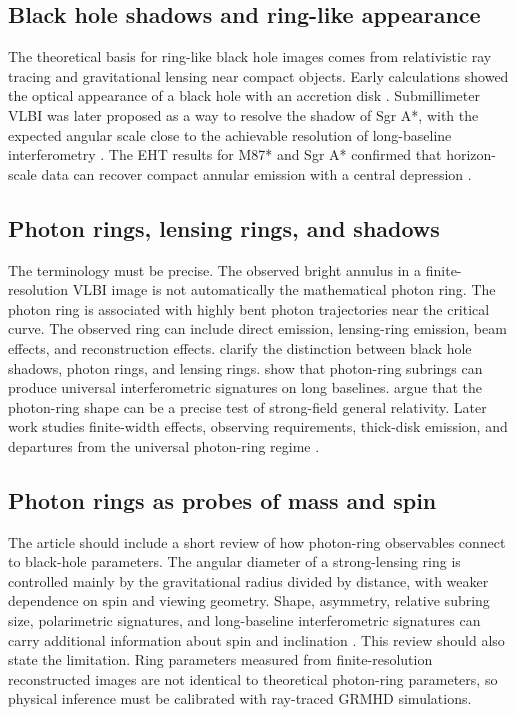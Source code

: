 \documentclass[11pt]{article}
\begin{document}
\subsection{Black hole shadows and ring-like appearance}
The theoretical basis for ring-like black hole images comes from relativistic ray tracing and gravitational lensing near compact objects. Early calculations showed the optical appearance of a black hole with an accretion disk \citep{Luminet1979}. Submillimeter VLBI was later proposed as a way to resolve the shadow of Sgr A*, with the expected angular scale close to the achievable resolution of long-baseline interferometry \citep{Falcke2000}. The EHT results for M87* and Sgr A* confirmed that horizon-scale data can recover compact annular emission with a central depression \citep{EHTM87I2019,EHTM87IV2019,EHTM87VI2019,EHTSgrAI2022,EHTSgrAIII2022,EHTSgrAIV2022}.

\subsection{Photon rings, lensing rings, and shadows}
The terminology must be precise. The observed bright annulus in a finite-resolution VLBI image is not automatically the mathematical photon ring. The photon ring is associated with highly bent photon trajectories near the critical curve. The observed ring can include direct emission, lensing-ring emission, beam effects, and reconstruction effects. \citet{GrallaHolzWald2019} clarify the distinction between black hole shadows, photon rings, and lensing rings. \citet{Johnson2020} show that photon-ring subrings can produce universal interferometric signatures on long baselines. \citet{GrallaLupsascaMarrone2020} argue that the photon-ring shape can be a precise test of strong-field general relativity. Later work studies finite-width effects, observing requirements, thick-disk emission, and departures from the universal photon-ring regime \citep{Wielgus2022,Vincent2022,Paugnat2022,Jia2024}.

\subsection{Photon rings as probes of mass and spin}
The article should include a short review of how photon-ring observables connect to black-hole parameters. The angular diameter of a strong-lensing ring is controlled mainly by the gravitational radius divided by distance, with weaker dependence on spin and viewing geometry. Shape, asymmetry, relative subring size, polarimetric signatures, and long-baseline interferometric signatures can carry additional information about spin and inclination \citep{GrallaLupsascaMarrone2020,Broderick2022,Palumbo2023}. This review should also state the limitation. Ring parameters measured from finite-resolution reconstructed images are not identical to theoretical photon-ring parameters, so physical inference must be calibrated with ray-traced GRMHD simulations.
\end{document}
